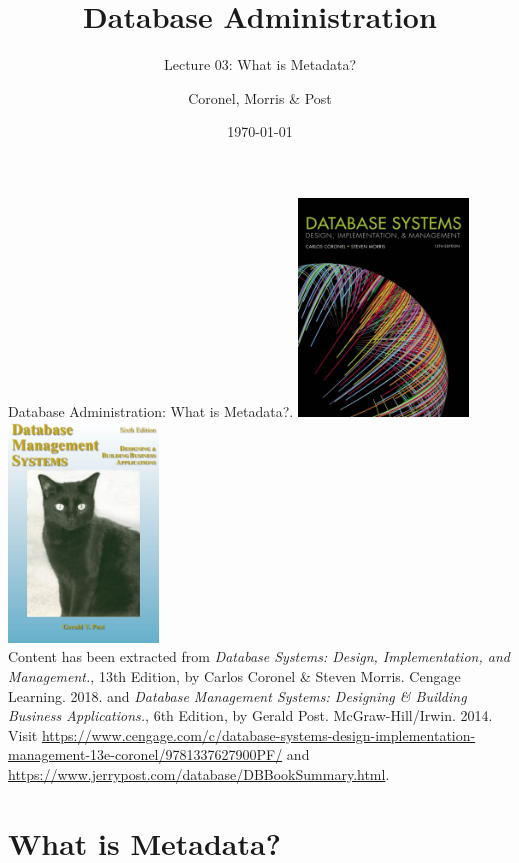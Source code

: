 \documentclass{beamer}
\title[Metadata]{Database Administration}
\subtitle{Lecture 03: What is Metadata?}
\author{Coronel, Morris \& Post}
\date{\today}
\begin{document}
\frame{\titlepage}

\begin{frame}{Database Administration: What is Metadata?.}
    \centering
    \includegraphics[width=0.34\textwidth]{figures/book_cover2.jpg}
    \includegraphics[width=0.3\textwidth]{figures/book_cover3.jpg} \\
    \vspace{5mm}
    {
        \tiny
        Content has been extracted from \textit{Database Systems: Design, Implementation, and Management.}, 13th Edition, by Carlos Coronel \& Steven Morris. Cengage Learning. 2018. and \textit{Database Management Systems: Designing \& Building Business Applications.}, 6th Edition, by Gerald Post. McGraw-Hill/Irwin. 2014. \\
        Visit \url{https://www.cengage.com/c/database-systems-design-implementation-management-13e-coronel/9781337627900PF/} and \url{https://www.jerrypost.com/database/DBBookSummary.html}.\\
    }
\end{frame}

\section{What is Metadata?}
\end{document}
